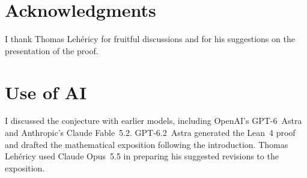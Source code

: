 \documentclass[11pt,a4paper]{article}
\begin{document}
\section*{Acknowledgments}
I thank Thomas Lehéricy for fruitful discussions and for his suggestions
on the presentation of the proof.

\section*{Use of AI}
I discussed the conjecture with earlier models, including OpenAI's
GPT-6~Astra and Anthropic's Claude Fable~5.2. GPT-6.2~Astra generated the
Lean~4 proof and drafted the mathematical exposition following the
introduction. Thomas Lehéricy used Claude Opus~5.5 in preparing his
suggested revisions to the exposition.
\end{document}
